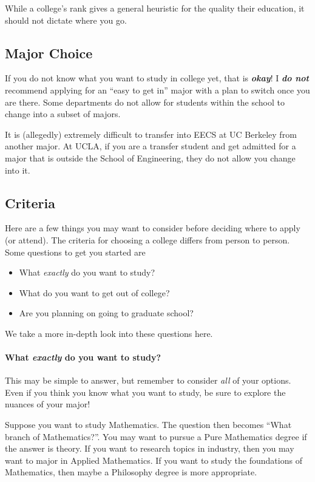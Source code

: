 \documentclass[11pt]{article}
\newenvironment{example}{
\begin{tcolorbox}[title=Example, colback=blue!5!white, colframe=black!75!blue]
}{ \end{tcolorbox} }
\renewcommand{\it}[1]{\textit{{#1}}}
\newcommand{\ib}[1]{\textit{\textbf{{#1}}}}
\begin{document}
While a college's rank gives a general heuristic for the quality their
education, it should not dictate where you go.


\subsection{Major Choice}
If you do not know what you want to study in college yet, that is \ib{okay}! I
\ib{do not} recommend applying for an ``easy to get in'' major with a plan to
switch once you are there. Some departments do not allow for students within the
school to change into a subset of majors.
\begin{example}
  It is (allegedly) extremely difficult to transfer into EECS at UC Berkeley
  from another major. At UCLA, if you are a transfer student and get admitted
  for a major that is outside the School of Engineering, they do not allow you
  change into it.
\end{example}

\subsection{Criteria}
Here are a few things you may want to consider before deciding where
to apply (or attend). The criteria for choosing a college differs from person to
person. Some questions to get you started are
\begin{itemize}[label=$\to$]
  \item What \it{exactly} do you want to study?
  \item What do you want to get out of college?
  \item Are you planning on going to graduate school?
\end{itemize}

We take a more in-depth look into these questions here.

\paragraph{What \ib{exactly} do you want to study?} This may be simple to
answer, but remember to consider \it{all} of your options. Even if you think you
know what you want to study, be sure to explore the nuances of your major!
\begin{example}
  Suppose you want to study Mathematics. The question then becomes ``What branch
  of Mathematics?''. You may want to pursue a Pure Mathematics degree if the
  answer is theory. If you want to research topics in industry, then you may
  want to major in Applied Mathematics. If you want to study the foundations of
  Mathematics, then maybe a Philosophy degree is more appropriate.
\end{example}
\end{document}
